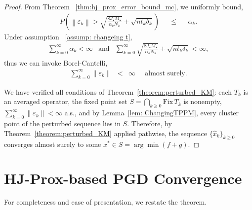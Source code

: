 \documentclass{article}
\newcommand{\amp}{\mathop{\:\:\,}\nolimits}
\theoremstyle{plain}
\theoremstyle{definition}
\theoremstyle{remark}
\begin{document}
\begin{proof}
From Theorem ~\ref{thm:hj_prox_error_bound_mc}, we uniformly bound,
\begin{eqnarray}
    P\left(\left\|\varepsilon_k\right\| > \sqrt{\frac{8J_\star M_\star}{\alpha_k N_k}} +\sqrt{nt_k\delta_k}\right) \amp \leq \amp \alpha_k.
\end{eqnarray}
Under assumption ~\ref{assump: changeing t}, 
\begin{eqnarray}
    \sum_{k=0}^\infty \alpha_k < \infty &\text{and}& \sum_{k=0}^\infty \sqrt{\frac{8J_\star M_\star}{\alpha_k N_k}}+\sqrt{nt_k\delta_k}< \infty,
\end{eqnarray}
thus we can invoke Borel-Cantelli, 
\begin{eqnarray}
\sum_{k=0}^\infty \|\varepsilon_k\| &<& \infty \amp \text{almost surely}.
\end{eqnarray}

We have verified all conditions of Theorem~\ref{theorem:perturbed_KM}: each $T_k$ is an averaged operator, the fixed point set $S = \bigcap_{k \geq 0} \mathrm{Fix}\, T_k$ is nonempty, $\sum_{k=0}^\infty \|\varepsilon_k\| < \infty$ a.s., and by Lemma~\ref{lem: ChangingTPPM}, every cluster point of the perturbed sequence lies in $S$. Therefore, by Theorem~\ref{theorem:perturbed_KM} applied pathwise, the sequence $\{\hat{x}_k\}_{k\geq 0}$ converges almost surely to some $x^* \in S = \arg\min(f+g)$.
\end{proof}







\section{HJ-Prox-based PGD Convergence}
For completeness and ease of presentation, we restate the theorem.
\end{document}
